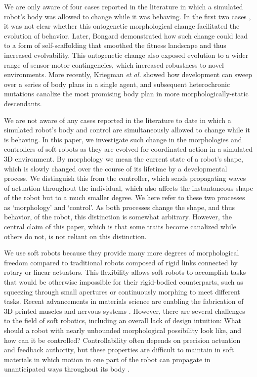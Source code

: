 We are only aware of four cases reported in the literature in which a simulated robot's body was allowed to change while it was behaving.
In the first two cases \cite{ventrella1998designing, komosinski2003framsticks}, it was not clear whether this ontogenetic morphological change facilitated the evolution of behavior.
Later, Bongard \cite{bongard2011morphological} demonstrated how such change could lead to a form of self-scaffolding that smoothed the fitness landscape and thus increased evolvability.
This ontogenetic change also exposed evolution to a wider range of sensor-motor contingencies, which increased robustness to novel environments.
More recently, Kriegman \textit{et al.} \cite{kriegman2017minimal} showed how development can sweep over a series of body plans in a single agent, and subsequent heterochronic mutations canalize the most promising body plan in more morphologically-static descendants.


We are not aware of any cases reported in the literature to date in which a simulated robot's body and control are simultaneously allowed to change while it is behaving.
In this paper, we investigate such change in the morphologies and controllers of soft robots as they are evolved for coordinated action in a simulated 3D environment.
By morphology we mean the current state of a robot’s shape, which is slowly changed over the course of its lifetime by a developmental process.
We distinguish this from the controller, which sends propagating waves of actuation throughout the individual, which also affects the instantaneous shape of the robot but to a much smaller degree.
We here refer to these two processes as `morphology' and `control'.
As both processes change the shape, and thus behavior, of the robot, this distinction is somewhat arbitrary.
However, the central claim of this paper, which is that some traits become canalized while others do not, is not reliant on this distinction.


We use soft robots because they provide many more degrees of morphological freedom compared to traditional robots composed of rigid links connected by rotary or linear actuators.
This flexibility allows soft robots to accomplish tasks that would be otherwise impossible for their rigid-bodied counterparts, such as squeezing through small apertures \cite{Cheney:2015:ESR:2739480.2754662} or continuously morphing to meet different tasks.
Recent advancements in materials science are enabling the fabrication of 3D-printed muscles \cite{miriyev2017soft} and nervous systems \cite{wehner2016integrated}.
However, there are several challenges to the field of soft robotics, including an overall lack of design intuition:
What should a robot with nearly unbounded morphological possibility look like, and how can it be controlled?
Controllability often depends on precision actuation and feedback authority, but these properties are difficult to maintain in soft materials in which motion in one part of the robot can propagate in unanticipated ways throughout its body \cite{lipson2014challenges}.

